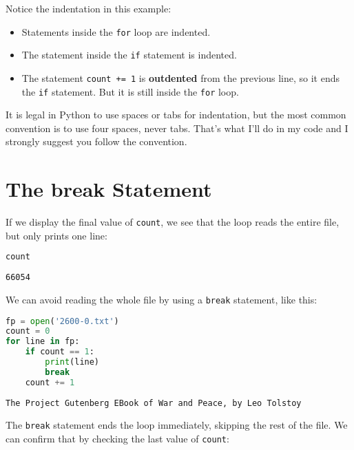 Notice the indentation in this example:

\begin{itemize}
\item
  Statements inside the \passthrough{\lstinline!for!} loop are indented.
\item
  The statement inside the \passthrough{\lstinline!if!} statement is
  indented.
\item
  The statement \passthrough{\lstinline!count += 1!} is
  \textbf{outdented} from the previous line, so it ends the
  \passthrough{\lstinline!if!} statement. But it is still inside the
  \passthrough{\lstinline!for!} loop.
\end{itemize}

It is legal in Python to use spaces or tabs for indentation, but the
most common convention is to use four spaces, never tabs. That's what
I'll do in my code and I strongly suggest you follow the convention.

\hypertarget{the-break-statement}{%
\section{The break Statement}\label{the-break-statement}}

If we display the final value of \passthrough{\lstinline!count!}, we see
that the loop reads the entire file, but only prints one line:

\begin{lstlisting}[language=Python,style=source]
count
\end{lstlisting}

\begin{lstlisting}[style=output]
66054
\end{lstlisting}

We can avoid reading the whole file by using a
\passthrough{\lstinline!break!} statement, like this:

\begin{lstlisting}[language=Python,style=source]
fp = open('2600-0.txt')
count = 0
for line in fp:
    if count == 1:
        print(line)
        break
    count += 1
\end{lstlisting}

\begin{lstlisting}[style=output]
The Project Gutenberg EBook of War and Peace, by Leo Tolstoy
\end{lstlisting}

The \passthrough{\lstinline!break!} statement ends the loop immediately,
skipping the rest of the file. We can confirm that by checking the last
value of \passthrough{\lstinline!count!}:

